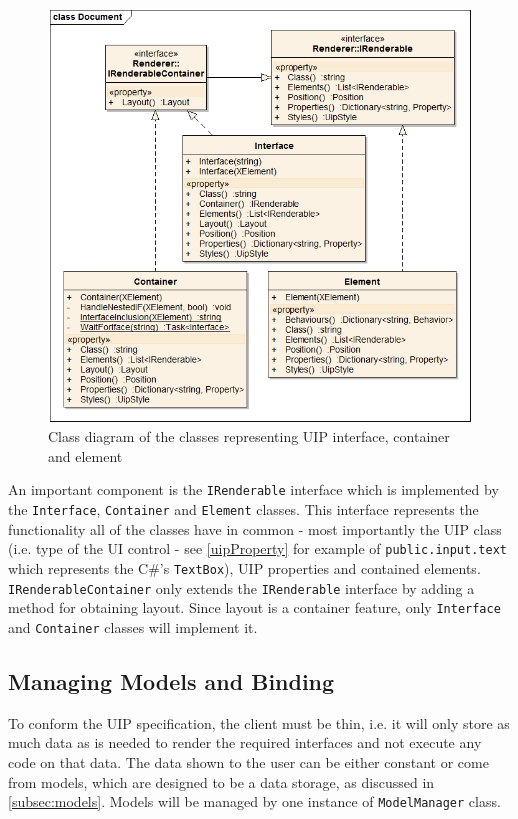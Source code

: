 \begin{figure}[ht!]
\centering
\includegraphics[width=145mm]{pics/3/classDocument2.png}
\caption{Class diagram of the classes representing UIP interface, container and element}
\label{fig:classDocument}
\end{figure}

An important component is the \texttt{IRenderable} interface which is implemented by the \texttt{Interface}, \texttt{Container} and \texttt{Element} classes. This interface represents the functionality all of the classes have in common - most importantly the UIP class (i.e. type of the UI control - see \ref{uipProperty} for example of \texttt{public.input.text} which represents the C\#'s \texttt{TextBox}), UIP properties and contained elements. \texttt{IRenderableContainer} only extends the \texttt{IRenderable} interface by adding a method for obtaining layout. Since layout is a container feature, only \texttt{Interface} and \texttt{Container} classes will implement it.

\subsection{Managing Models and Binding}
To conform the UIP specification, the client must be thin, i.e. it will only store as much data as is needed to render the required interfaces and not execute any code on that data. The data shown to the user can be either constant or come from models, which are designed to be a data storage, as discussed in \ref{subsec:models}. Models will be managed by one instance of \texttt{ModelManager} class.


